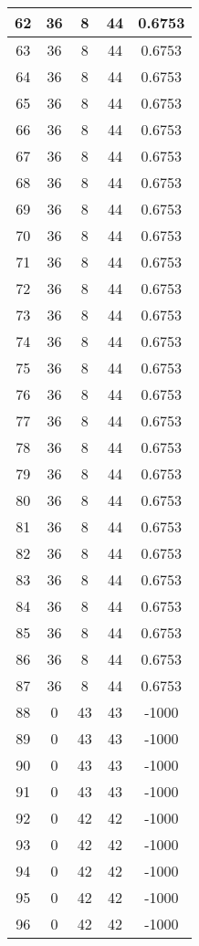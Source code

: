 \documentclass[letterpaper, 12pt]{article}
\begin{document}
\begin{longtable}{|c|c|c|c|c|}
\hline
62 & 36 & 8 & 44 & 0.6753 \\
\hline
63 & 36 & 8 & 44 & 0.6753 \\
\hline
64 & 36 & 8 & 44 & 0.6753 \\
\hline
65 & 36 & 8 & 44 & 0.6753 \\
\hline
66 & 36 & 8 & 44 & 0.6753 \\
\hline
67 & 36 & 8 & 44 & 0.6753 \\
\hline
68 & 36 & 8 & 44 & 0.6753 \\
\hline
69 & 36 & 8 & 44 & 0.6753 \\
\hline
70 & 36 & 8 & 44 & 0.6753 \\
\hline
71 & 36 & 8 & 44 & 0.6753 \\
\hline
72 & 36 & 8 & 44 & 0.6753 \\
\hline
73 & 36 & 8 & 44 & 0.6753 \\
\hline
74 & 36 & 8 & 44 & 0.6753 \\
\hline
75 & 36 & 8 & 44 & 0.6753 \\
\hline
76 & 36 & 8 & 44 & 0.6753 \\
\hline
77 & 36 & 8 & 44 & 0.6753 \\
\hline
78 & 36 & 8 & 44 & 0.6753 \\
\hline
79 & 36 & 8 & 44 & 0.6753 \\
\hline
80 & 36 & 8 & 44 & 0.6753 \\
\hline
81 & 36 & 8 & 44 & 0.6753 \\
\hline
82 & 36 & 8 & 44 & 0.6753 \\
\hline
83 & 36 & 8 & 44 & 0.6753 \\
\hline
84 & 36 & 8 & 44 & 0.6753 \\
\hline
85 & 36 & 8 & 44 & 0.6753 \\
\hline
86 & 36 & 8 & 44 & 0.6753 \\
\hline
87 & 36 & 8 & 44 & 0.6753 \\
\hline
88 & 0 & 43 & 43 & -1000 \\
\hline
89 & 0 & 43 & 43 & -1000 \\
\hline
90 & 0 & 43 & 43 & -1000 \\
\hline
91 & 0 & 43 & 43 & -1000 \\
\hline
92 & 0 & 42 & 42 & -1000 \\
\hline
93 & 0 & 42 & 42 & -1000 \\
\hline
94 & 0 & 42 & 42 & -1000 \\
\hline
95 & 0 & 42 & 42 & -1000 \\
\hline
96 & 0 & 42 & 42 & -1000 \\

\end{longtable}
\end{document}
